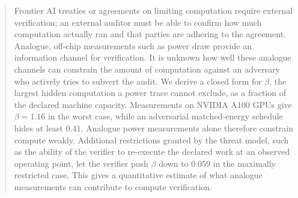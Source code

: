 \documentclass{article}
\theoremstyle{plain}
\theoremstyle{definition}
\theoremstyle{remark}
\begin{document}

\printAffiliationsAndNotice{}

\begin{abstract}
Frontier AI treaties or agreements on limiting computation require external verification; an external auditor must be able to confirm how much computation actually ran and that parties are adhering to the agreement.  Analogue, off-chip measurements such as power draw provide an information channel for verification. It is unknown how well these analogue channels can constrain the amount of computation against an adversary who actively tries to subvert the audit. We derive a closed form for $\beta$, the largest hidden computation a power trace cannot exclude, as a fraction of the declared machine capacity. Measurements on NVIDIA A100 GPUs give $\beta = 1.16$ in the worst case, while an adversarial matched-energy schedule hides at least $0.41$. Analogue power measurements alone therefore constrain compute weakly. Additional restrictions granted by the threat model, such as the ability of the verifier to re-execute the declared work at an observed operating point, let the verifier push $\beta$ down to $0.059$ in the maximally restricted case. This gives a quantitative estimate of what analogue measurements can contribute to compute verification.
\end{abstract}
\end{document}
